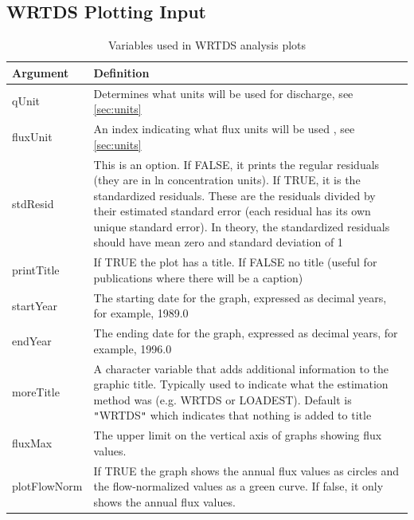 \documentclass[a4paper,11pt]{article}\usepackage[]{graphicx}\usepackage[]{color}
\begin{document}
\FloatBarrier
\clearpage

\subsection{WRTDS Plotting Input}
\label{sec:wrtdsOutputVariables}

\begin{table}[ht]
\caption{Variables used in WRTDS analysis plots  \label{tab:wrtdsVariables}}
\begin{tabularx}{\textwidth}{lX}
\hline
  \textbf{Argument} & \textbf{Definition} \\
\hline
qUnit & Determines what units will be used for discharge, see \ref{sec:units}\\
fluxUnit & An index indicating what flux units will be used , see \ref{sec:units}\\
stdResid & This is an option.  If FALSE, it prints the regular residuals (they are in ln concentration units).  If TRUE, it is the standardized residuals.  These are the residuals divided by their estimated standard error (each residual has its own unique standard error).  In theory, the standardized residuals should have mean zero and standard deviation of 1 \\
printTitle & If TRUE the plot has a title.  If FALSE no title (useful for publications where there will be a caption) \\
startYear & The starting date for the graph, expressed as decimal years, for example, 1989.0 \\
endYear & The ending date for the graph, expressed as decimal years, for example, 1996.0 \\
moreTitle & A character variable that adds additional information to the graphic title.  Typically used to indicate what the estimation method was (e.g. WRTDS or LOADEST).  Default is \texttt{"}WRTDS\texttt{"} which indicates that nothing is added to title \\
fluxMax & The upper limit on the vertical axis of graphs showing flux values.  \\
plotFlowNorm & If TRUE the graph shows the annual flux values as circles and the flow-normalized values as a green curve.  If false, it only shows the annual flux values.\\
\hline
\end{tabularx}

\end{table}
\end{document}
